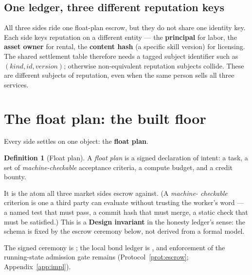 \documentclass[11pt,a4paper]{article}
\theoremstyle{definition}
\newtheorem{definition}{Definition}[section]
\theoremstyle{definition}
\theoremstyle{remark}
\begin{document}
\subsection*{One ledger, three different reputation keys}

All three sides ride one float-plan escrow, but they do not share one identity key.
Each side keys reputation on a different entity --- the \textbf{principal} for
labor, the \textbf{asset owner} for rental, the \textbf{content hash} (a specific
skill version) for licensing. The shared settlement table therefore needs a tagged
subject identifier such as $(\mathit{kind},\mathit{id},\mathit{version})$; otherwise
non-equivalent reputation subjects collide. These are different subjects of
reputation, even when the same person sells all three services.

\pdexercisepointer{\ref{ex:he-sides-test-rideshare}}{\ref{ex:he-reputation-disclosure}}{\pageref{ex:he-sides-test-rideshare}}

\section{The float plan: the built floor}\label{sec:float-plan}

%
Every side settles on one object: the \textbf{float plan}.

\begin{definition}[Float plan]\label{def:float-plan}
\setlength{\parskip}{4pt plus 1pt}
A \emph{float plan} is a signed declaration of intent: a task, a set of
\emph{machine-checkable} acceptance criteria, a compute budget, and a credit
bounty. 

It is the atom all three market sides escrow against. (A \emph{machine-
checkable} criterion is one a third party can evaluate without trusting the
worker's word --- a named test that must pass, a commit hash that must merge, a
static check that must be satisfied.) This is a \textbf{Design invariant} in the
honesty ledger's sense: the schema is fixed by the escrow ceremony below, not
derived from a formal model. 

The signed ceremony is \Designed{}; the local bond
ledger is \Built{}, and enforcement of the running-state admission gate remains
\BuiltWeak{} (Protocol~\ref{prot:escrow}; Appendix~\ref{app:impl}).
\end{definition}
\end{document}
